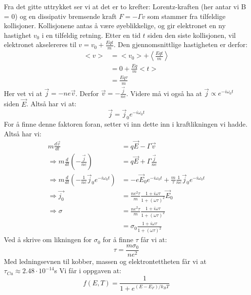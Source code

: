\documentclass{article}
\begin{document}
Fra det gitte uttrykket ser vi at det er to krefter: Lorentz-kraften (her antar vi B = 0) og en dissipativ bremsende kraft $F = - \Gamma v$ som stammer fra tilfeldige kollisjoner. Kollisjonene antas å være øyeblikkelige, og gir elektronet en ny hastighet $v_0$ i en tilfeldig retning. Etter en tid $t$ siden den siste kollisjonen, vil elektronet akselereres til $v = v_0 + \frac{Eq t}{m}$. Den gjennomsnittlige hastigheten er derfor:
\begin{align}
    <v> &= <v_0> + \left< \frac{Eq t}{m}\right> \\
        &= 0 + \frac{Eq }{m}<t> \\
        &= \frac{Eq \tau}{m} 
\end{align}
Her vet vi at $\vec{j} = - ne \vec{v}$. Derfor $\vec{v} = -\frac{\vec{j}}{ne}$. Videre må vi også ha at $\vec{j} \propto e^{-i\omega_0 t}$ siden $\vec{E}$. Altså har vi at:
\begin{equation}
\vec{j} = \vec{j}_0 e^{-i\omega_0 t}
\end{equation}
For å finne denne faktoren foran, setter vi inn dette inn i kraftlikningen vi hadde. Altså har vi:
\begin{align}
    m \frac{d\vec{v}}{dt} &= q \vec{E} - \Gamma \vec{v}\\
\Rightarrow m \frac{d}{dt} \left(-\frac{\vec{j}}{ne} \right) &= q \vec{E} + \Gamma\frac{\vec{j}}{ne} \\
\Rightarrow m\frac{d}{dt} \left(-\frac{1}{ne}\vec{j}_0 e^{-i\omega_0 t} \right) &= -e \vec{E}_0 e^{-i\omega_0 t} + \frac{m}{\tau}\frac{1}{{ne}}\vec{j}_0 e^{-i\omega_0 t} \\
\Rightarrow \vec{j_0} &= \frac{n e^2 \tau}{m}\frac{1+i \omega \tau}{1+(\omega\tau)^2} \vec{E}_0 \\
\Rightarrow \sigma &=\frac{n e^2 \tau}{m}\frac{1+i \omega \tau}{1+(\omega\tau)^2} \\
&= \sigma_0 \frac{1+i \omega \tau}{1+(\omega\tau)^2}
\end{align}
Ved å skrive om likningen for $\sigma_0$ for å finne $\tau$ får vi at:
\begin{equation}
    \tau = \frac{m \sigma_0}{ne^2}
\end{equation}
Med ledningsevnen til kobber, massen og elektrontettheten får vi at $\tau_{Cu} \approx 2.48 
\cdot 10^{-14}$s
Vi får i oppgaven at:
\begin{equation}
    f(E, T) = \frac{1}{1 + e^{(E-E_F)/ k_BT}}
\end{equation}
\end{document}
